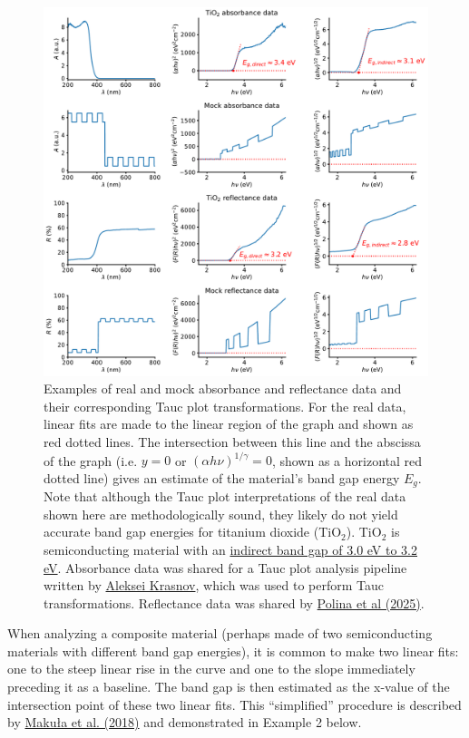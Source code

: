 \documentclass[letterpaper, 12pt]{article}
\begin{document}
\pagebreak
\begin{figure}[h!tbp]
    \centering
    \includegraphics[width=\textwidth]{img/tauc/250320_tauc_demo.pdf}
    \caption*{Examples of real and mock absorbance and reflectance data and their corresponding Tauc plot transformations. For the real data, linear fits are made to the linear region of the graph and shown as red dotted lines. The intersection between this line and the abscissa of the graph (i.e. $y = 0$ or $(\alpha h \nu)^{1/\gamma} = 0$, shown as a horizontal red dotted line) gives an estimate of the material's band gap energy $E_g$. Note that although the Tauc plot interpretations of the real data shown here are methodologically sound, they likely do not yield accurate band gap energies for titanium dioxide (TiO$_2$). TiO$_2$ is semiconducting material with an \href{https://doi.org/10.1038/srep04043}{indirect band gap of 3.0 eV to 3.2 eV}. Absorbance data was shared for a Tauc plot analysis pipeline written by   \href{https://github.com/alexey-krasnov/absorption_tauc_plot}{Aleksei Krasnov}, which was used to perform Tauc transformations. Reflectance data was shared by \href{https://doi.org/10.5281/zenodo.14608640}{Polina et al (2025)}.}
\end{figure}

When analyzing a composite material (perhaps made of two semiconducting materials with different band gap energies), it is common to make two linear fits: one to the steep linear rise in the curve and one to the slope immediately preceding it as a baseline. The band gap is then estimated as the x-value of the intersection point of these two linear fits. This ``simplified'' procedure is described by \href{https://doi.org/10.1021/acs.jpclett.8b02892}{Maku\l{}a et al. (2018)} and demonstrated in Example 2 below.
\end{document}
